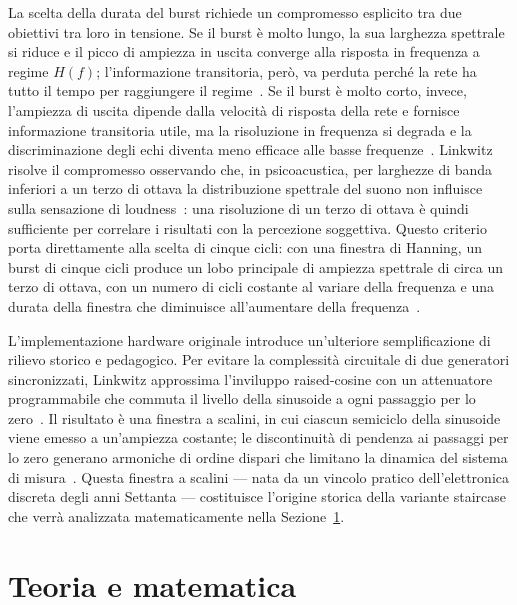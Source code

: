 \documentclass[11pt,a4paper]{article}
\begin{document}
La scelta della durata del burst richiede un compromesso esplicito tra due obiettivi tra loro in tensione.
Se il burst è molto lungo, la sua larghezza spettrale si riduce e il picco di ampiezza in uscita converge alla risposta in frequenza a regime $H(f)$; l'informazione transitoria, però, va perduta perché la rete ha tutto il tempo per raggiungere il regime~\cite{linkwitz1980shaped}.
Se il burst è molto corto, invece, l'ampiezza di uscita dipende dalla velocità di risposta della rete e fornisce informazione transitoria utile, ma la risoluzione in frequenza si degrada e la discriminazione degli echi diventa meno efficace alle basse frequenze~\cite{linkwitz1978narrowband}.
Linkwitz risolve il compromesso osservando che, in psicoacustica, per larghezze di banda inferiori a un terzo di ottava la distribuzione spettrale del suono non influisce sulla sensazione di loudness~\cite{linkwitz1980shaped}: una risoluzione di un terzo di ottava è quindi sufficiente per correlare i risultati con la percezione soggettiva.
Questo criterio porta direttamente alla scelta di cinque cicli: con una finestra di Hanning, un burst di cinque cicli produce un lobo principale di ampiezza spettrale di circa un terzo di ottava, con un numero di cicli costante al variare della frequenza e una durata della finestra che diminuisce all'aumentare della frequenza~\cite{linkwitz1980shaped}.

L'implementazione hardware originale introduce un'ulteriore semplificazione di rilievo storico e pedagogico.
Per evitare la complessità circuitale di due generatori sincronizzati, Linkwitz approssima l'inviluppo raised-cosine con un attenuatore programmabile che commuta il livello della sinusoide a ogni passaggio per lo zero~\cite{linkwitz1980shaped}.
Il risultato è una finestra a scalini, in cui ciascun semiciclo della sinusoide viene emesso a un'ampiezza costante; le discontinuità di pendenza ai passaggi per lo zero generano armoniche di ordine dispari che limitano la dinamica del sistema di misura~\cite{linkwitz1978narrowband}.
Questa finestra a scalini — nata da un vincolo pratico dell'elettronica discreta degli anni Settanta — costituisce l'origine storica della variante staircase che verrà analizzata matematicamente nella Sezione~\ref{sec:teoria}.

\section{Teoria e matematica}\label{sec:teoria}
\end{document}

